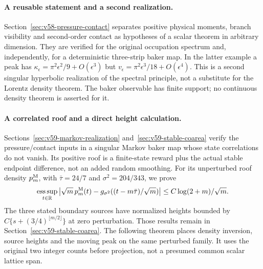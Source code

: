\documentclass[11pt,reqno]{amsart}
\numberwithin{equation}{section}
\theoremstyle{definition}\newtheorem{definition}[theorem]{Definition}
\theoremstyle{remark}\newtheorem{remark}[theorem]{Remark}
\newcommand{\R}{\mathbb R}\newcommand{\Z}{\mathbb Z}\newcommand{\T}{\mathbb T}
\begin{document}
\paragraph{A reusable statement and a second realization.}
Section~\ref{sec:v58-pressure-contact} separates positive physical
moments, branch visibility and second-order contact as hypotheses of
a scalar theorem in arbitrary dimension. They are verified for the
original occupation spectrum and, independently, for a deterministic
three-strip baker map. In the latter example a peak has
$\kappa_\epsilon=\pi^2\epsilon^2/9+O(\epsilon^3)$ but
$v_\epsilon=\pi^2\epsilon^3/18+O(\epsilon^4)$. This is a second
singular hyperbolic realization of the spectral principle, not a
substitute for the Lorentz density theorem. The baker observable has
finite support; no continuous density theorem is asserted for it.

\paragraph{A correlated roof and a direct height calculation.}
Sections~\ref{sec:v59-markov-realization} and~\ref{sec:v59-stable-coarea}
verify the pressure/contact inputs in a singular Markov baker map whose
state correlations do not vanish. Its positive roof is a finite-state
reward plus the actual stable endpoint difference, not an added random
smoothing. For its unperturbed roof density $p_m^{\rm M}$, with
$\bar\tau=24/7$ and $\sigma^2=204/343$, we prove
\[
 \operatorname*{ess\,sup}_{t\in\R}
 \left|\sqrt m\,p_m^{\rm M}(t)
       -g_{\sigma^2}((t-m\bar\tau)/\sqrt m)\right|
                 \le C\log(2+m)/\sqrt m.
\]
The three stated boundary sources have normalized heights bounded by
$C\{s+(3/4)^{\lfloor m/2\rfloor}\}$ at zero perturbation. Those results
remain in Section~\ref{sec:v59-stable-coarea}. The following theorem
places density inversion, source heights and the moving peak on the
same perturbed family. It uses the original two integer counts before
projection, not a presumed common scalar lattice span.
\end{document}
